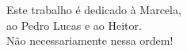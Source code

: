 Este trabalho é dedicado à Marcela,\\
ao Pedro Lucas e ao Heitor.\\
Não necessariamente nessa ordem!

